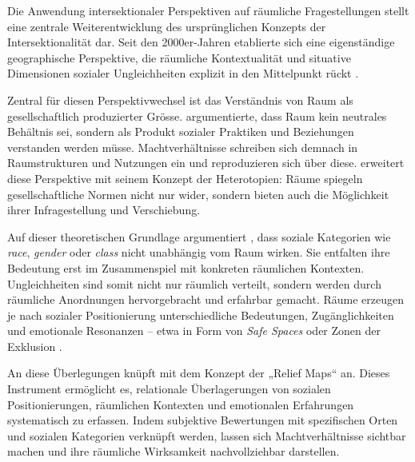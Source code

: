 \vspace{2em}

Die Anwendung intersektionaler Perspektiven auf räumliche Fragestellungen stellt eine zentrale Weiterentwicklung des ursprünglichen Konzepts der Intersektionalität dar. Seit den 2000er-Jahren etablierte sich eine eigenständige geographische Perspektive, die räumliche Kontextualität und situative Dimensionen sozialer Ungleichheiten explizit in den Mittelpunkt rückt \parencite{valentineTheorizingResearchingIntersectionality2007, rodo-de-zarateIntersectionalityFeministGeographies2018}.

Zentral für diesen Perspektivwechsel ist das Verständnis von Raum als gesellschaftlich produzierter Grösse. \textcite{lefebvreProductionLespace1974} argumentierte, dass Raum kein neutrales Behältnis sei, sondern als Produkt sozialer Praktiken und Beziehungen verstanden werden müsse. Machtverhältnisse schreiben sich demnach in Raumstrukturen und Nutzungen ein und reproduzieren sich über diese. \textcite{foucaultEspacesAutres2004} erweitert diese Perspektive mit seinem Konzept der Heterotopien: Räume spiegeln gesellschaftliche Normen nicht nur wider, sondern bieten auch die Möglichkeit ihrer Infragestellung und Verschiebung.

Auf dieser theoretischen Grundlage argumentiert \textcite{valentineTheorizingResearchingIntersectionality2007}, dass soziale Kategorien wie \textit{race}, \textit{gender} oder \textit{class} nicht unabhängig vom Raum wirken. Sie entfalten ihre Bedeutung erst im Zusammenspiel mit konkreten räumlichen Kontexten. Ungleichheiten sind somit nicht nur räumlich verteilt, sondern werden durch räumliche Anordnungen hervorgebracht und erfahrbar gemacht. Räume erzeugen je nach sozialer Positionierung unterschiedliche Bedeutungen, Zugänglichkeiten und emotionale Resonanzen -- etwa in Form von \textit{Safe Spaces} oder Zonen der Exklusion \parencite[\gls{vgl}][S.~548--549]{rodo-de-zarateIntersectionalityFeministGeographies2018}.

An diese Überlegungen knüpft \textcite{rodo-de-zarateDevelopingGeographiesIntersectionality2014} mit dem Konzept der „Relief Maps“ an. Dieses Instrument ermöglicht es, relationale Überlagerungen von sozialen Positionierungen, räumlichen Kontexten und emotionalen Erfahrungen systematisch zu erfassen. Indem subjektive Bewertungen mit spezifischen Orten und sozialen Kategorien verknüpft werden, lassen sich Machtverhältnisse sichtbar machen und ihre räumliche Wirksamkeit nachvollziehbar darstellen.

